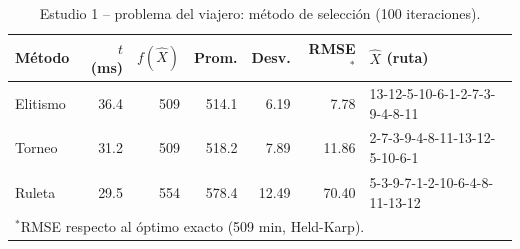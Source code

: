\begin{table}[!t]
\centering
\scriptsize
\setlength{\tabcolsep}{2.5pt}
\caption{Estudio 1 -- problema del viajero: m\'etodo de selecci\'on (100 iteraciones).}
\label{tab:t1v}
\begin{tabular}{lrrrrrl}
\hline
M\'etodo & $t$ (ms) & $f(\hat{X})$ & Prom. & Desv. & RMSE$^*$ & $\hat{X}$ (ruta) \\
\hline
Elitismo & 36.4 & 509 & 514.1 & 6.19 & 7.78 & 13-12-5-10-6-1-2-7-3-9-4-8-11 \\
Torneo & 31.2 & 509 & 518.2 & 7.89 & 11.86 & 2-7-3-9-4-8-11-13-12-5-10-6-1 \\
Ruleta & 29.5 & 554 & 578.4 & 12.49 & 70.40 & 5-3-9-7-1-2-10-6-4-8-11-13-12 \\
\hline
\multicolumn{7}{l}{$^*$RMSE respecto al \'optimo exacto (509 min, Held-Karp).}
\end{tabular}
\end{table}
